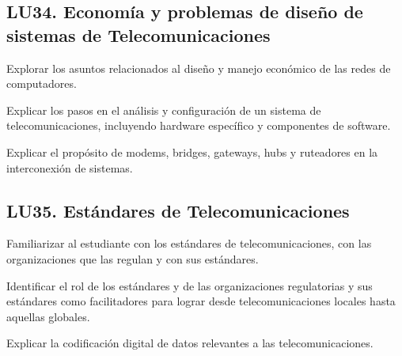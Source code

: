 \subsection{LU34. Economía y problemas de diseño de sistemas de Telecomunicaciones}\label{sec:LU34}
\begin{LearningUnit}
\begin{LUGoal}
\item Explorar los asuntos relacionados al diseño y manejo económico de las redes de computadores.
\end{LUGoal}

\begin{LUObjective}
\item Explicar los pasos en el análisis y configuración de un sistema de telecomunicaciones, incluyendo hardware específico y componentes de software.
\item Explicar el propósito de modems, bridges, gateways, hubs y ruteadores en la interconexión de sistemas.
\end{LUObjective}
\end{LearningUnit}

\subsection{LU35. Estándares de Telecomunicaciones}\label{sec:LU35}
\begin{LearningUnit}
\begin{LUGoal}
\item Familiarizar al estudiante con los estándares de telecomunicaciones, con las organizaciones que las regulan y con sus estándares.
\end{LUGoal}

\begin{LUObjective}
\item Identificar el rol de los estándares y de las organizaciones regulatorias y sus estándares como facilitadores para lograr desde telecomunicaciones locales hasta aquellas globales.
\item Explicar la codificación digital de datos relevantes a las telecomunicaciones.
\end{LUObjective}
\end{LearningUnit}

